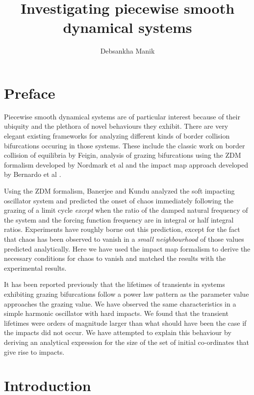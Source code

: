 \documentclass{book}
\renewcommand{\(}{\begin{columns}}
\renewcommand{\)}{\end{columns}}
\newcommand{\<}[1]{\begin{column}{#1}}
\renewcommand{\>}{\end{column}}
\begin{document}
\title{Investigating piecewise smooth dynamical systems}
\author{Debsankha Manik}
\maketitle

\frontmatter
\chapter{Preface}
Piecewise smooth dynamical systems are of particular interest because of their 
ubiquity and the plethora of novel behaviours they exhibit.  There are very elegant existing frameworks
for analyzing different kinds of border collision bifurcations occuring in those systems.
These include the classic work on border collision of equilibria by Feigin\cite{feigin-1970}, analysis of grazing 
bifurcations using the ZDM formalism developed by Nordmark et al \cite{dm-orig-nordmark} and the impact map 
approach developed by Bernardo et al \cite[p.~10]{bernardo-book}.

Using the ZDM formalism, Banerjee and Kundu analyzed the soft impacting oscillator system
and predicted the onset of chaos immediately following the grazing of a limit 
cycle \emph{except} when the ratio of the damped natural frequency of the 
system and the forcing function frequency are in integral or half integral 
ratios.  Experiments have roughly borne out this prediction, except for the 
fact that chaos has been observed to vanish in a \emph{small neighbourhood} of 
those values predicted analytically.  Here we have used the impact map formalism to 
derive the necessary conditions for chaos to vanish and matched the results with the 
experimental results.  

It has been reported previously that the lifetimes of transients in  systems 
exhibiting grazing bifurcations follow a power law pattern as the parameter 
value approaches the grazing value.  We have observed the same characteristics 
in a simple harmonic oscillator with hard impacts. We found that the transient 
lifetimes were orders of magnitude larger than what should have been the case 
if the impacts did not occur.   We have attempted to explain this 
behaviour by deriving an analytical expression for the size of the set of initial 
co-ordinates that give rise to impacts.  

\tableofcontents

\mainmatter
\chapter{Introduction}
\end{document}
